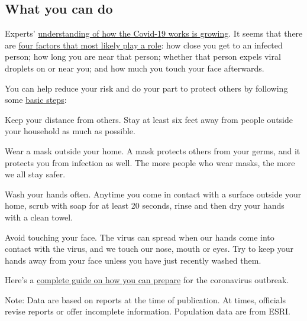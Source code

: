 \hypertarget{what-you-can-do}{%
\subsection{What you can do}\label{what-you-can-do}}

Experts'
\href{https://www.nytimes3xbfgragh.onion/2020/06/02/health/coronavirus-profile-covid.html}{understanding
of how the Covid-19 works is growing}. It seems that there are
\href{https://www.nytimes3xbfgragh.onion/article/coronavirus-how-it-spreads.html}{four
factors that most likely play a role}: how close you get to an infected
person; how long you are near that person; whether that person expels
viral droplets on or near you; and how much you touch your face
afterwards.

You can help reduce your risk and do your part to protect others by
following some
\href{https://www.nytimes3xbfgragh.onion/article/prepare-for-coronavirus.html}{basic
steps}:

Keep your distance from others. Stay at least six feet away from people
outside your household as much as possible.

Wear a mask outside your home. A mask protects others from your germs,
and it protects you from infection as well. The more people who wear
masks, the more we all stay safer.

Wash your hands often. Anytime you come in contact with a surface
outside your home, scrub with soap for at least 20 seconds, rinse and
then dry your hands with a clean towel.

Avoid touching your face. The virus can spread when our hands come into
contact with the virus, and we touch our nose, mouth or eyes. Try to
keep your hands away from your face unless you have just recently washed
them.

Here's a
\href{https://www.nytimes3xbfgragh.onion/interactive/2020/world/coronavirus-tips-advice.html}{complete
guide on how you can prepare} for the coronavirus outbreak.

Note: Data are based on reports at the time of publication. At times,
officials revise reports or offer incomplete information. Population
data are from ESRI.

